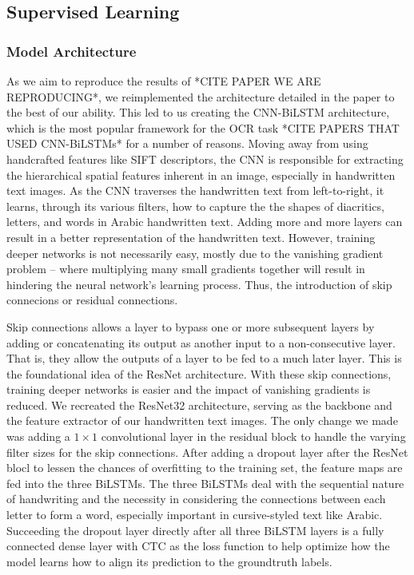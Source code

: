 \documentclass[conference]{IEEEtran}
\begin{document}
\subsection{Supervised Learning}

\subsubsection{Model Architecture}

As we aim to reproduce the results of *CITE PAPER WE ARE REPRODUCING*, we reimplemented the architecture detailed in the paper to the best of our ability. This led to us creating the CNN-BiLSTM architecture, which is the most popular framework for the OCR task *CITE PAPERS THAT USED CNN-BiLSTMs* for a number of reasons. Moving away from using handcrafted features like SIFT descriptors, the CNN is responsible for extracting the hierarchical spatial features inherent in an image, especially in handwritten text images. As the CNN traverses the handwritten text from left-to-right, it learns, through its various filters, how to capture the the shapes of diacritics, letters, and words in Arabic handwritten text. Adding more and more layers can result in a better representation of the handwritten text. However, training deeper networks is not necessarily easy, mostly due to the vanishing gradient problem -- where multiplying many small gradients together will result in hindering the neural network's learning process. Thus, the introduction of skip connecions or residual connections.

Skip connections allows a layer to bypass one or more subsequent layers by adding or concatenating its output as another input to a non-consecutive layer. That is, they allow the outputs of a layer to be fed to a much later layer. This is the foundational idea of the ResNet architecture. With these skip connections, training deeper networks is easier and the impact of vanishing gradients is reduced. We recreated the ResNet32 architecture, serving as the backbone and the feature extractor of our handwritten text images. The only change we made was adding a \( 1 \times 1 \) convolutional layer in the residual block to handle the varying filter sizes for the skip connections. After adding a dropout layer after the ResNet blocl to lessen the chances of overfitting to the training set, the feature maps are fed into the three BiLSTMs. The three BiLSTMs deal with the sequential nature of handwriting and the necessity in considering the connections between each letter to form a word, especially important in cursive-styled text like Arabic. Succeeding the dropout layer directly after all three BiLSTM layers is a fully connected dense layer with CTC as the loss function to help optimize how the model learns how to align its prediction to the groundtruth labels.
\end{document}
